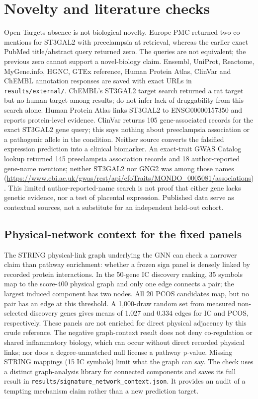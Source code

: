 \documentclass[11pt,a4paper]{article}
\begin{document}
\section{Novelty and literature checks}
Open Targets absence is not biological novelty. Europe PMC returned two co-mentions for ST3GAL2 with preeclampsia at retrieval, whereas the earlier exact PubMed title/abstract query returned zero. The queries are not equivalent; the previous zero cannot support a novel-biology claim. Ensembl, UniProt, Reactome, MyGene.info, HGNC, GTEx reference, Human Protein Atlas, ClinVar and ChEMBL annotation responses are saved with exact URLs in \texttt{results/external/}. ChEMBL's ST3GAL2 target search returned a rat target but no human target among results; do not infer lack of druggability from this search alone. Human Protein Atlas links ST3GAL2 to ENSG00000157350 and reports protein-level evidence. ClinVar returns 105 gene-associated records for the exact ST3GAL2 gene query; this says nothing about preeclampsia association or a pathogenic allele in the condition. Neither source converts the falsified expression prediction into a clinical biomarker. An exact-trait GWAS Catalog lookup returned 145 preeclampsia association records and 18 author-reported gene-name mentions; neither ST3GAL2 nor GNG2 was among those names (\url{https://www.ebi.ac.uk/gwas/rest/api/efoTraits/MONDO_0005081/associations}). This limited author-reported-name search is not proof that either gene lacks genetic evidence, nor a test of placental expression. Published data serve as contextual sources, not a substitute for an independent held-out cohort.
\subsection{Physical-network context for the fixed panels}
The STRING physical-link graph underlying the GNN can check a narrower claim than pathway enrichment: whether a frozen sign panel is densely linked by recorded protein interactions. In the 50-gene IC discovery ranking, 35 symbols map to the score-400 physical graph and only one edge connects a pair; the largest induced component has two nodes. All 20 PCOS candidates map, but no pair has an edge at this threshold. A 1,000-draw random set from measured non-selected discovery genes gives means of 1.027 and 0.334 edges for IC and PCOS, respectively. These panels are not enriched for direct physical adjacency by this crude reference. The negative graph-context result does not deny co-regulation or shared inflammatory biology, which can occur without direct recorded physical links; nor does a degree-unmatched null license a pathway p-value. Missing STRING mappings (15 IC symbols) limit what the graph can say. The check uses a distinct graph-analysis library for connected components and saves its full result in \texttt{results/signature\_network\_context.json}. It provides an audit of a tempting mechanism claim rather than a new prediction target.
\end{document}
